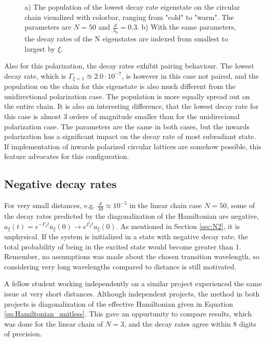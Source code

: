 \documentclass{article}
\begin{document}
\begin{figure}[H]
\begin{subfigure}[b]{0.49\textwidth}
        \caption{}
        \label{fig:circular_inwards_decayrates}
    \end{subfigure}
    \caption{a) The population of the lowest decay rate eigenstate on the circular chain visualized with colorbar, ranging from "cold" to "warm". The parameters are $N=50$ and $\frac{d}{\lambda_0}=0.3$. b) With the same parameters, the decay rates of the N eigenstates are indexed from smallest to largest by $\xi$. }
    \label{fig:circular_inwards}
\end{figure}

Also for this polarization, the decay rates exhibit pairing behaviour. The lowest decay rate, which is $\Gamma_{\xi=1} \approxeq 2.0 \cdot 10^{-7}$, is however in this case not paired, and the population on the chain for this eigenstate is also much different from the unidirectional polarization case. The population is more equally spread out on the entire chain. It is also an interesting difference, that the lowest decay rate for this case is almost 3 orders of magnitude smaller than for the unidirecional polarization case. The parameters are the same in both cases, but the inwards polarization has a significant impact on the decay rate of most subradiant state. If implementation of inwards polarized circular lattices are somehow possible, this feature advocates for this configuration. 

\subsection{Negative decay rates}\label{disc:negative}

\noindent
For very small distances, e.g. $\frac{d}{\lambda0} \approx 10^{-5}$ in the linear chain case $N=50$, some of the decay rates predicted by the diagonalization of the Hamiltonian are negative, $a_\xi(t)=e^{-\Gamma_\xi t} a_\xi (0) \rightarrow e^{\Gamma_\xi t} a_\xi (0)$. As mentioned in Section \ref{sec:N2}, it is unphysical. If the system is initialized in a state with negative decay rate, the total probability of being in the excited state would become greater than 1. Remember, no assumptions was made about the chosen transition wavelength, so considering very long wavelengths compared to distance is still motivated. 

A fellow student working independently on a similar project experienced the same issue at very short distances. Although independent projects, the method in both projects is diagonalization of the effective Hamiltonian given in Equation \ref{eq:Hamiltonian_unitless}. This gave an oppurtunity to compare results, which was done for the linear chain of $N=3$, and the decay rates agree within 8 digits of precision. 
\end{document}
